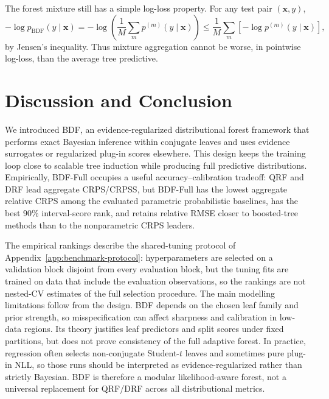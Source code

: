 \documentclass[10pt]{article} %
\begin{document}
The forest mixture still has a simple log-loss property. For any test pair $(\mathbf{x},y)$,
\begin{equation}\label{eq:mixture_jensen}
-\log p_{\mathrm{BDF}}(y \mid \mathbf{x})
= -\log\!\left(\frac{1}{M}\sum_m p^{(m)}(y \mid \mathbf{x})\right)
\le \frac{1}{M}\sum_m \left[-\log p^{(m)}(y \mid \mathbf{x})\right],
\end{equation}
by Jensen's inequality. Thus mixture aggregation cannot be worse, in pointwise log-loss, than the average tree predictive.



\section{Discussion and Conclusion}\label{sec:discussion}

We introduced BDF, an evidence-regularized distributional forest framework that performs exact Bayesian inference within conjugate leaves and uses evidence surrogates or regularized plug-in scores elsewhere. This design keeps the training loop close to scalable tree induction while producing full predictive distributions. Empirically, BDF-Full occupies a useful accuracy--calibration tradeoff: QRF and DRF lead aggregate CRPS/CRPSS, but BDF-Full has the lowest aggregate relative CRPS among the evaluated parametric probabilistic baselines, has the best 90\% interval-score rank, and retains relative RMSE closer to boosted-tree methods than to the nonparametric CRPS leaders.

The empirical rankings describe the shared-tuning protocol of Appendix~\ref{app:benchmark-protocol}: hyperparameters are selected on a validation block disjoint from every evaluation block, but the tuning fits are trained on data that include the evaluation observations, so the rankings are not nested-CV estimates of the full selection procedure. The main modelling limitations follow from the design. BDF depends on the chosen leaf family and prior strength, so misspecification can affect sharpness and calibration in low-data regions. Its theory justifies leaf predictors and split scores under fixed partitions, but does not prove consistency of the full adaptive forest. In practice, regression often selects non-conjugate Student-$t$ leaves and sometimes pure plug-in NLL, so those runs should be interpreted as evidence-regularized rather than strictly Bayesian. BDF is therefore a modular likelihood-aware forest, not a universal replacement for QRF/DRF across all distributional metrics.
\end{document}
